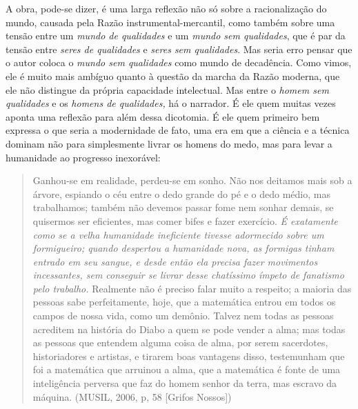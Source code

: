 A obra, pode-se dizer, é uma larga reflexão não só sobre a
racionalização do mundo, causada pela Razão instrumental-mercantil, como
também sobre uma tensão entre um \emph{mundo de qualidades} e um
\emph{mundo sem qualidades}, que é par da tensão entre \emph{seres de
qualidades} e \emph{seres sem qualidades}. Mas seria erro pensar que o
autor coloca o \emph{mundo sem qualidades} como mundo de decadência.
Como vimos, ele é muito mais ambíguo quanto à questão da marcha da Razão
moderna, que ele não distingue da própria capacidade intelectual. Mas
entre o \emph{homem sem qualidades} e os \emph{homens de qualidades,} há
o narrador. É ele quem muitas vezes aponta uma reflexão para além dessa
dicotomia. É ele quem primeiro bem expressa o que seria a modernidade de
fato, uma era em que a ciência e a técnica dominam não para simplesmente
livrar os homens do medo, mas para levar a humanidade ao progresso
inexorável:

\begin{quote}
Ganhou-se em realidade, perdeu-se em sonho. Não nos deitamos mais sob a
árvore, espiando o céu entre o dedo grande do pé e o dedo médio, mas
trabalhamos; também não devemos passar fome nem sonhar demais, se
quisermos ser eficientes, mas comer bifes e fazer exercício. \emph{É
exatamente como se a velha humanidade ineficiente tivesse adormecido
sobre um formigueiro; quando despertou a humanidade nova, as formigas
tinham entrado em seu sangue, e desde então ela precisa fazer movimentos
incessantes, sem conseguir se livrar desse chatíssimo ímpeto de
fanatismo pelo trabalho.} Realmente não é preciso falar muito a
respeito; a maioria das pessoas sabe perfeitamente, hoje, que a
matemática entrou em todos os campos de nossa vida, como um demônio.
Talvez nem todas as pessoas acreditem na história do Diabo a quem se
pode vender a alma; mas todas as pessoas que entendem alguma coisa de
alma, por serem sacerdotes, historiadores e artistas, e tirarem boas
vantagens disso, testemunham que foi a matemática que arruinou a alma,
que a matemática é fonte de uma inteligência perversa que faz do homem
senhor da terra, mas escravo da máquina. (MUSIL, 2006, p, 58 {[}Grifos
Nossos{]})
\end{quote}

